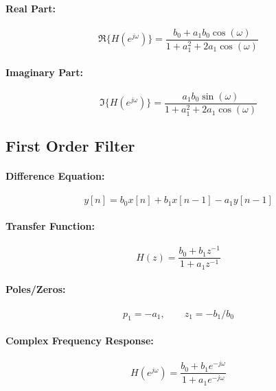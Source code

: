 \paragraph{Real Part:}
\begin{equation}
 \Re \{ H(e^{j \omega}) \} = \frac{b_0 + a_1 b_0 \cos (\omega) }
                                  {1 + a_1^2 + 2 a_1 \cos (\omega)}
\end{equation}

\paragraph{Imaginary Part:}
\begin{equation}
 \Im \{ H(e^{j \omega}) \} =  \frac{a_1 b_0 \sin (\omega) }
                                   {1 + a_1^2 + 2 a_1 \cos (\omega)}
\end{equation}



\subsection{First Order Filter}

\paragraph{Difference Equation:}
\begin{equation}
 y[n] = b_0 x[n] + b_1 x[n-1] - a_1 y[n-1]
\end{equation}

\paragraph{Transfer Function:}
\begin{equation}
 H(z) = \frac{b_0 + b_1 z^{-1}}{1 + a_1 z^{-1}}
\end{equation}

\paragraph{Poles/Zeros:}
\begin{equation}
 p_1 = -a_1, \qquad z_1 = -b_1/b_0
\end{equation}

\paragraph{Complex Frequency Response:}
\begin{equation}
 H(e^{j \omega}) = \frac{b_0 + b_1 e^{-j \omega}}{1 + a_1 e^{-j \omega}}
\end{equation}

